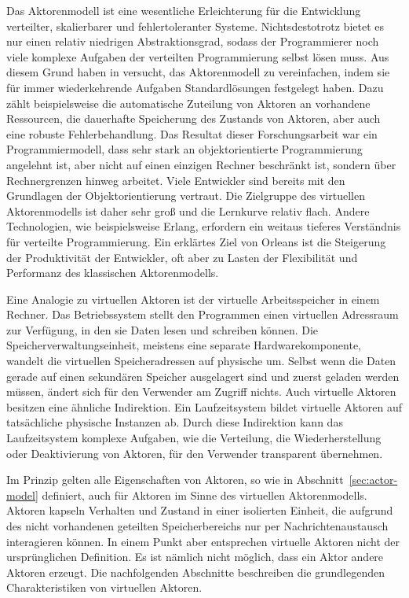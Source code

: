 Das Aktorenmodell ist eine wesentliche Erleichterung für die Entwicklung verteilter, skalierbarer und fehlertoleranter Systeme. Nichtsdestotrotz bietet es nur einen relativ niedrigen Abstraktionsgrad, sodass der Programmierer noch viele komplexe Aufgaben der verteilten Programmierung selbst lösen muss. Aus diesem Grund haben \citeauthor{virtualActors} in \cite{virtualActors} versucht, das Aktorenmodell zu vereinfachen, indem sie für immer wiederkehrende Aufgaben Standardlösungen festgelegt haben. Dazu zählt beispielsweise die automatische Zuteilung von Aktoren an vorhandene Ressourcen, die dauerhafte Speicherung des Zustands von Aktoren, aber auch eine robuste Fehlerbehandlung. Das Resultat dieser Forschungsarbeit war ein Programmiermodell, dass sehr stark an objektorientierte Programmierung angelehnt ist, aber nicht auf einen einzigen Rechner beschränkt ist, sondern über Rechnergrenzen hinweg arbeitet. Viele Entwickler sind bereits mit den Grundlagen der Objektorientierung vertraut. Die Zielgruppe des virtuellen Aktorenmodells ist daher sehr groß und die Lernkurve relativ flach. Andere Technologien, wie beispielsweise Erlang, erfordern ein weitaus tieferes Verständnis für verteilte Programmierung. Ein erklärtes Ziel von Orleans ist die Steigerung der Produktivität der Entwickler, oft aber zu Lasten der Flexibilität und Performanz des klassischen Aktorenmodells.

Eine Analogie zu virtuellen Aktoren ist der virtuelle Arbeitsspeicher in einem Rechner. Das Betriebssystem stellt den Programmen einen virtuellen Adressraum zur Verfügung, in den sie Daten lesen und schreiben können. Die Speicherverwaltungseinheit, meistens eine separate Hardwarekomponente, wandelt die virtuellen Speicheradressen auf physische um. Selbst wenn die Daten gerade auf einen sekundären Speicher ausgelagert sind und zuerst geladen werden müssen, ändert sich für den Verwender am Zugriff nichts. Auch virtuelle Aktoren besitzen eine ähnliche Indirektion. Ein Laufzeitsystem bildet virtuelle Aktoren auf tatsächliche physische Instanzen ab. Durch diese Indirektion kann das Laufzeitsystem komplexe Aufgaben, wie die Verteilung, die Wiederherstellung oder Deaktivierung von Aktoren, für den Verwender transparent übernehmen.

Im Prinzip gelten alle Eigenschaften von Aktoren, so wie in Abschnitt~\ref{sec:actor-model} definiert, auch für Aktoren im Sinne des virtuellen Aktorenmodells. \Dah Aktoren kapseln Verhalten und Zustand in einer isolierten Einheit, die aufgrund des nicht vorhandenen geteilten Speicherbereichs nur per Nachrichtenaustausch interagieren können. In einem Punkt aber entsprechen virtuelle Aktoren nicht der ursprünglichen Definition. Es ist nämlich nicht möglich, dass ein Aktor andere Aktoren erzeugt. Die nachfolgenden Abschnitte beschreiben die grundlegenden Charakteristiken von virtuellen Aktoren.

